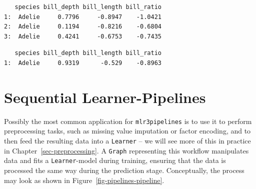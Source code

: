 \begin{verbatim}
   species bill_depth bill_length bill_ratio
1:  Adelie     0.7796     -0.8947    -1.0421
2:  Adelie     0.1194     -0.8216    -0.6804
3:  Adelie     0.4241     -0.6753    -0.7435
\end{verbatim}

\begin{Shaded}
\begin{Highlighting}[]
\OtherTok{=}\SpecialCharTok{$}
\NormalTok{result[[}\NormalTok{]]}\SpecialCharTok{$}\NormalTok{()}
\end{Highlighting}
\end{Shaded}

\begin{verbatim}
   species bill_depth bill_length bill_ratio
1:  Adelie     0.9319      -0.529    -0.8963
\end{verbatim}

\hypertarget{sec-pipelines-sequential}{%
\section{Sequential Learner-Pipelines}\label{sec-pipelines-sequential}}

Possibly the most common application for \texttt{mlr3pipelines} is to
use it to perform preprocessing tasks, such as
missing value imputation or factor
encoding, and to then feed the resulting data
into a \texttt{Learner} -- we will see more of this in practice in
Chapter~\ref{sec-preprocessing}. A \texttt{Graph} representing this
workflow manipulates data and fits a \texttt{Learner}-model during
training, ensuring that the data is processed the same way during the
prediction stage. Conceptually, the process may look as shown in
Figure~\ref{fig-pipelines-pipeline}.

